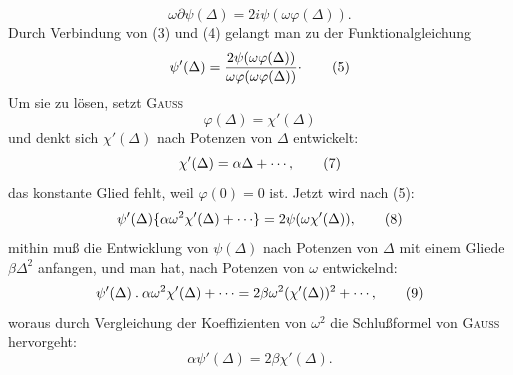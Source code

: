 \begin{equation}\omega\partial\psi(\Delta)=2i\psi(\omega\varphi(\Delta)).\tag{4}\end{equation}
\noindent Durch Verbindung von (3) und (4) gelangt man zu der Funktionalgleichung
\begin{equation}\psi'(\Delta)=\frac{2\psi(\omega\varphi(\Delta))}{\omega\varphi(\omega\varphi(\Delta))}\mathpunct{\raisebox{.45ex}{.}}\tag{5}\end{equation}
\noindent Um sie zu lösen, setzt \textsc{Gauss}
\begin{equation}\varphi(\Delta)=\chi'(\Delta)\tag{6}\end{equation}
\noindent und denkt sich \(\chi'(\Delta)\) nach Potenzen von \(\Delta\) entwickelt:
\begin{equation}\chi'(\Delta)=\alpha\Delta+\mathinner{\cdotp\cdotp\cdotp},\tag{7}\end{equation}
\clearpage{}
\noindent das konstante Glied fehlt, weil \(\varphi(0)=0\) ist. Jetzt wird nach (5):
\begin{equation}\psi'(\Delta)\{\alpha\omega^2\chi'(\Delta)+\mathinner{\cdotp\cdotp\cdotp}\}=2\psi(\omega\chi'(\Delta)),\tag{8}\end{equation}
\noindent mithin muß die Entwicklung von \(\psi(\Delta)\) nach Potenzen von \(\Delta\) mit einem Gliede \(\beta\Delta^2\) anfangen, und man hat, nach Potenzen von \(\omega\) entwickelnd:
\begin{equation}\psi'(\Delta)\mathbin{.}\alpha\omega^2\chi'(\Delta)+\mathinner{\cdotp\cdotp\cdotp}=2\beta\omega^2(\chi'(\Delta))^2+\mathinner{\cdotp\cdotp\cdotp},\tag{9}\end{equation}
\noindent woraus durch Vergleichung der Koeffizienten von \(\omega^2\) die Schlußformel von \textsc{Gauss} hervorgeht:
\begin{equation}\alpha\psi'(\Delta)=2\beta\chi'(\Delta).\tag{10}\end{equation}

